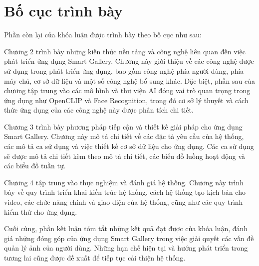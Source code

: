 \section{Bố cục trình bày}

Phần còn lại của khóa luận được trình bày theo bố cục như sau: 

Chương 2 trình bày những kiến thức nền tảng và công nghệ liên quan đến việc phát triển ứng dụng Smart Gallery. Chương này giới thiệu về các công nghệ được sử dụng trong phát triển ứng dụng, bao gồm công nghệ phía người dùng, phía máy chủ, cơ sở dữ liệu và một số công nghệ bổ sung khác. Đặc biệt, phần sau của chương tập trung vào các mô hình và thư viện AI đóng vai trò quan trọng trong ứng dụng như OpenCLIP và Face Recognition, trong đó cơ sở lý thuyết và cách thức ứng dụng của các công nghệ này được phân tích chi tiết.

Chương 3 trình bày phương pháp tiếp cận và thiết kế giải pháp cho ứng dụng Smart Gallery. Chương này mô tả chi tiết về các đặc tả yêu cầu của hệ thống, các mô tả ca sử dụng và việc thiết kế cơ sở dữ liệu cho ứng dụng. Các ca sử dụng sẽ được mô tả chi tiết kèm theo mô tả chi tiết, các biểu đồ luồng hoạt động và các biểu đồ tuần tự.

Chương 4 tập trung vào thực nghiệm và đánh giá hệ thống. Chương này trình bày về quy trình triển khai kiến trúc hệ thống, cách hệ thống tạo kịch bản cho video, các chức năng chính và giao diện của hệ thống, cũng như các quy trình kiểm thử cho ứng dụng. 

Cuối cùng, phần kết luận tóm tắt những kết quả đạt được của khóa luận, đánh giá những đóng góp của ứng dụng Smart Gallery trong việc giải quyết các vấn đề quản lý ảnh của người dùng. Những hạn chế hiện tại và hướng phát triển trong tương lai cũng được đề xuất để tiếp tục cải thiện hệ thống.